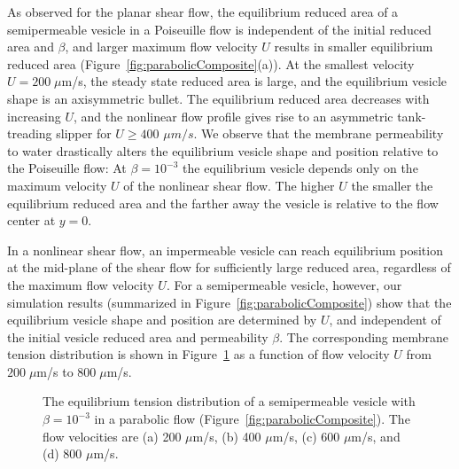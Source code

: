\documentclass[prb,preprint,showpacs,preprintnumbers,amsmath,amssymb,longbibliography]{revtex4-1}
\begin{document}
As observed for the planar shear flow, the equilibrium reduced area of a
semipermeable vesicle in a Poiseuille flow is independent of the initial
reduced area and $\beta$, and  larger maximum flow velocity $U$ results
in smaller equilibrium reduced area
(Figure~\ref{fig:parabolicComposite}(a)). At the smallest velocity $U=
200\; \mu$m/s, the steady state reduced area is large, and the
equilibrium vesicle shape is an axisymmetric bullet. The equilibrium
reduced area decreases with increasing $U$, and the nonlinear flow
profile gives rise to an asymmetric tank-treading slipper for $U\ge 400$
$\mu m/s$. We observe that the membrane permeability to water
drastically alters the equilibrium vesicle shape and position relative
to the Poiseuille flow: At $\beta=10^{-3}$ the equilibrium vesicle
depends only on the maximum velocity $U$ of the nonlinear shear flow.
The higher $U$ the smaller the equilibrium reduced area and the farther
away the vesicle is relative to the flow center at $y=0$.  

In a nonlinear shear flow, an impermeable vesicle can reach equilibrium
position at the mid-plane of the shear flow for sufficiently large
reduced area, regardless of the maximum flow velocity $U$. For a
semipermeable vesicle, however, our simulation results (summarized in
Figure~\ref{fig:parabolicComposite}) show that the equilibrium vesicle
shape and position are determined by $U$, and independent of the initial
vesicle reduced area and permeability $\beta$. The corresponding
membrane tension distribution is shown in
Figure~\ref{fig:parabolicTensions} as a function of flow velocity $U$
from $200\;\mu$m/s to $800 \;\mu$m/s.

\begin{figure}[htp]
  \centering
  \caption{\label{fig:parabolicTensions} The equilibrium tension
  distribution of a semipermeable vesicle with $\beta=10^{-3}$ in a parabolic
  flow (Figure~\ref{fig:parabolicComposite}). The flow velocities
  are (a) 200 $\mu$m/s, (b) 400 $\mu$m/s, (c) 600 $\mu$m/s, and (d)
  800 $\mu$m/s.}
\end{figure}
\end{document}
